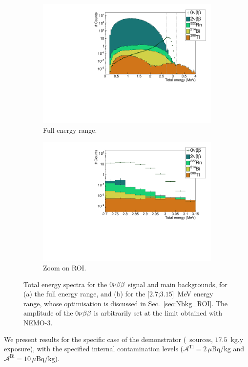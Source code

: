 \begin{figure}[h]
\centering
\begin{subfigure}[t]{0.7\textwidth}
  \centering
  \includegraphics[width=1.1\textwidth]{Sensitivity/fig_sensitivity/energy_spectrum_with_B_82Se.pdf}
  \captionsetup{justification=centering}
  \caption{Full energy range.
    \label{subfig:energy_spectra_full}}
\end{subfigure}
\hfill
\begin{subfigure}[t]{0.7\textwidth}
  \centering
  \includegraphics[width=1.1\textwidth]{Sensitivity/fig_sensitivity/energy_spectrum_with_B_82Se_zoom.pdf}
  \captionsetup{justification=centering}
  \caption{Zoom on ROI.
    \label{subfig:energy_spectra_zoom}}
\end{subfigure}
\caption{Total energy spectra for the $0\nu\beta\beta$ signal and main backgrounds, for (a) the full energy range, and (b) for the [$2.7$;$3.15$]~MeV energy range, whose optimisation is discussed in Sec.~\ref{sec:Nbkg_ROI}.
  The amplitude of the $0\nu\beta\beta$ is arbitrarily set at the limit obtained with NEMO-$3$.
  \label{fig:energy_spectra}}
\end{figure}
We present results for the specific case of the demonstrator (\Se\ sources, $17.5$~kg.y exposure), with the specified internal contamination levels ($\mathcal{A}^{\text{Tl}} = 2\,\mu$Bq/kg and $\mathcal{A}^{\text{Bi}} = 10\,\mu$Bq/kg).

